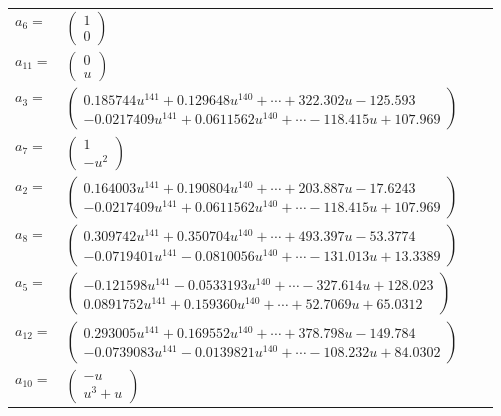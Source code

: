 \documentclass[1p]{elsarticle_modified}
\theoremstyle{definition}
\begin{document}
\begin{tabular}{m{7pt} m{180pt} m{7pt} m{180pt} }
\flushright $a_{6}=$&$\begin{pmatrix}1\\0\end{pmatrix}$ \\
\flushright $a_{11}=$&$\begin{pmatrix}0\\u\end{pmatrix}$ \\
\flushright $a_{3}=$&$\begin{pmatrix}0.185744 u^{141}+0.129648 u^{140}+\cdots+322.302 u-125.593\\-0.0217409 u^{141}+0.0611562 u^{140}+\cdots-118.415 u+107.969\end{pmatrix}$ \\
\flushright $a_{7}=$&$\begin{pmatrix}1\\- u^2\end{pmatrix}$ \\
\flushright $a_{2}=$&$\begin{pmatrix}0.164003 u^{141}+0.190804 u^{140}+\cdots+203.887 u-17.6243\\-0.0217409 u^{141}+0.0611562 u^{140}+\cdots-118.415 u+107.969\end{pmatrix}$ \\
\flushright $a_{8}=$&$\begin{pmatrix}0.309742 u^{141}+0.350704 u^{140}+\cdots+493.397 u-53.3774\\-0.0719401 u^{141}-0.0810056 u^{140}+\cdots-131.013 u+13.3389\end{pmatrix}$ \\
\flushright $a_{5}=$&$\begin{pmatrix}-0.121598 u^{141}-0.0533193 u^{140}+\cdots-327.614 u+128.023\\0.0891752 u^{141}+0.159360 u^{140}+\cdots+52.7069 u+65.0312\end{pmatrix}$ \\
\flushright $a_{12}=$&$\begin{pmatrix}0.293005 u^{141}+0.169552 u^{140}+\cdots+378.798 u-149.784\\-0.0739083 u^{141}-0.0139821 u^{140}+\cdots-108.232 u+84.0302\end{pmatrix}$ \\
\flushright $a_{10}=$&$\begin{pmatrix}- u\\u^3+u\end{pmatrix}$ \\

\end{tabular}
\end{document}
